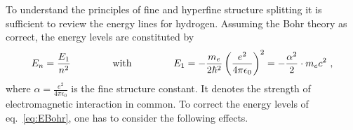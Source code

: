 To understand the principles of fine and hyperfine structure splitting it is sufficient to review the energy lines for hydrogen.
Assuming the Bohr theory as correct, the energy levels are constituted by
	\begin{align}
	\label{eq:EBohr}
	E_n 	= \frac{E_1}{n^2} 
	\hspace{1.5cm} \text{with} \hspace{1.5cm} 
	E_1 	= - \frac{m_e}{2 \hbar^2}\left(\frac{e^2}{4 \pi \epsilon_0}\right)^2 
		= - \frac{\alpha^2}{2}\cdot m_e c^2\ ,
	\end{align}
where $\alpha = \frac{e^2}{4 \pi \epsilon_0}$ is the fine structure constant. 
It denotes the strength of electromagnetic interaction in common.
To correct the energy levels of eq.~\ref{eq:EBohr}, one has to consider the following effects.
	
